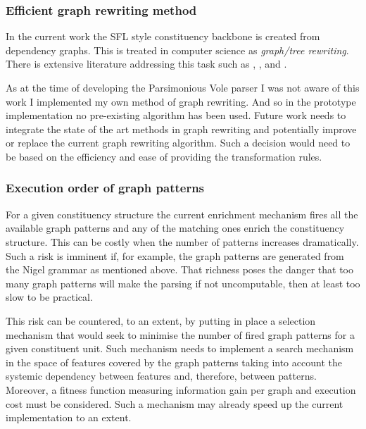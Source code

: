 
\subsubsection{Efficient graph rewriting method}
    
    In the current work the SFL style constituency backbone is created from dependency graphs. This is treated in computer science as \textit{graph/tree rewriting}. There is extensive literature addressing this task such as \citet{barendregt1987term}, \citet{courcelle1990graph}, \citet{plasmeijer1993functional} and \citet{grzegorz1999handbook}. 
    
    As at the time of developing the Parsimonious Vole parser I was not aware of this work I implemented my own method of graph rewriting. And so in the prototype implementation no pre-existing algorithm has been used. Future work needs to integrate the state of the art methods in graph rewriting and potentially improve or replace the current graph rewriting algorithm. Such a decision would need to be based on the efficiency and ease of providing the transformation rules.

\subsubsection{Execution order of graph patterns}  
    
    For a given constituency structure the current enrichment mechanism fires all the available graph patterns and any of the matching ones enrich the constituency structure. This can be costly when the number of patterns increases dramatically. Such a risk is imminent if, for example, the graph patterns are generated from the Nigel grammar as mentioned above. That richness poses the danger that too many graph patterns will make the parsing if not uncomputable, then at least too slow to be practical. 
    
    This risk can be countered, to an extent, by putting in place a selection mechanism that would seek to minimise the number of fired graph patterns for a given constituent unit. Such mechanism needs to implement a search mechanism in the space of features covered by the graph patterns taking into account the systemic dependency between features and, therefore, between patterns. Moreover, a fitness function measuring information gain per graph and execution cost must be considered. Such a mechanism may already speed up the current implementation to an extent. 
    

